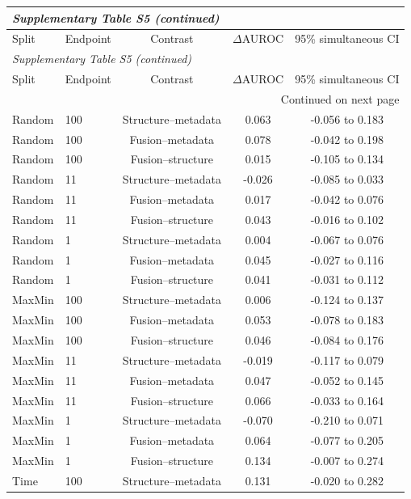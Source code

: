 \begin{longtable}{llccc}
\multicolumn{5}{l}{\textit{Supplementary Table S5 (continued)}} \\
\toprule Split & Endpoint & Contrast & $\Delta$AUROC & 95\% simultaneous CI \\ \midrule\endfirsthead
\multicolumn{5}{l}{\textit{Supplementary Table S5 (continued)}} \\
\toprule Split & Endpoint & Contrast & $\Delta$AUROC & 95\% simultaneous CI \\ \midrule\endhead
\midrule\multicolumn{5}{r}{Continued on next page}\\\endfoot
\bottomrule\endlastfoot
Random & 100 & Structure--metadata & 0.063 & -0.056 to 0.183 \\
Random & 100 & Fusion--metadata & 0.078 & -0.042 to 0.198 \\
Random & 100 & Fusion--structure & 0.015 & -0.105 to 0.134 \\
Random & 11 & Structure--metadata & -0.026 & -0.085 to 0.033 \\
Random & 11 & Fusion--metadata & 0.017 & -0.042 to 0.076 \\
Random & 11 & Fusion--structure & 0.043 & -0.016 to 0.102 \\
Random & 1 & Structure--metadata & 0.004 & -0.067 to 0.076 \\
Random & 1 & Fusion--metadata & 0.045 & -0.027 to 0.116 \\
Random & 1 & Fusion--structure & 0.041 & -0.031 to 0.112 \\
MaxMin & 100 & Structure--metadata & 0.006 & -0.124 to 0.137 \\
MaxMin & 100 & Fusion--metadata & 0.053 & -0.078 to 0.183 \\
MaxMin & 100 & Fusion--structure & 0.046 & -0.084 to 0.176 \\
MaxMin & 11 & Structure--metadata & -0.019 & -0.117 to 0.079 \\
MaxMin & 11 & Fusion--metadata & 0.047 & -0.052 to 0.145 \\
MaxMin & 11 & Fusion--structure & 0.066 & -0.033 to 0.164 \\
MaxMin & 1 & Structure--metadata & -0.070 & -0.210 to 0.071 \\
MaxMin & 1 & Fusion--metadata & 0.064 & -0.077 to 0.205 \\
MaxMin & 1 & Fusion--structure & 0.134 & -0.007 to 0.274 \\
Time & 100 & Structure--metadata & 0.131 & -0.020 to 0.282 \\

\end{longtable}
